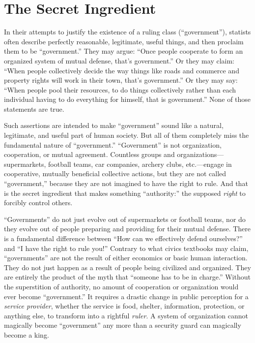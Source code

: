 \documentclass{book}
\begin{document}
\section{The Secret Ingredient}

In their attempts to justify the existence of a ruling class (\enquote{government}), statists often describe perfectly reasonable, legitimate, useful things, and then proclaim them to be \enquote{government.} They may argue: \enquote{Once people cooperate to form an organized system of mutual defense, that's government.} Or they may claim: \enquote{When people collectively decide the way things like roads and commerce and property rights will work in their town, that's government.} Or they may say: \enquote{When people pool their resources, to do things collectively rather than each individual having to do everything for himself, that is government.} None of those statements are true.

Such assertions are intended to make \enquote{government} sound like a natural, legitimate, and useful part of human society. But all of them completely miss the fundamental nature of \enquote{government.} \enquote{Government} is not organization, cooperation, or mutual agreement. Countless groups and organizations---supermarkets, football teams, car companies, archery clubs, etc.---engage in cooperative, mutually beneficial collective actions, but they are not called \enquote{government,} because they are not imagined to have the right to rule. And that is the secret ingredient that makes something \enquote{authority:} the supposed \emph{right} to forcibly control others.

\enquote{Governments} do not just evolve out of supermarkets or football teams, nor do they evolve out of people preparing and providing for their mutual defense. There is a fundamental difference between \enquote{How can we effectively defend ourselves?} and \enquote{I have the right to rule you!} Contrary to what civics textbooks may claim, \enquote{governments} are not the result of either economics or basic human interaction. They do not just happen as a result of people being civilized and organized. They are entirely the product of the myth that \enquote{someone has to be in charge.} Without the superstition of authority, no amount of cooperation or organization would ever become \enquote{government.} It requires a drastic change in public perception for a \emph{service provider}, whether the service is food, shelter, information, protection, or anything else, to transform into a rightful \emph{ruler}. A system of organization cannot magically become \enquote{government} any more than a security guard can magically become a king.
\end{document}
